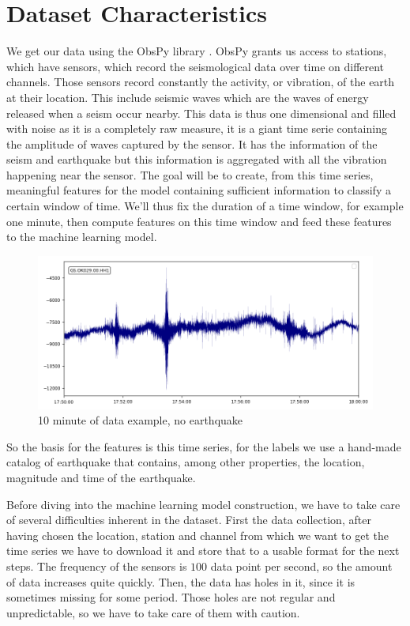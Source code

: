 \documentclass[10pt,conference,compsocconf]{IEEEtran}
\begin{document}
\section{Dataset Characteristics}
We get our data using the ObsPy library \cite{obspy}. ObsPy grants us access to stations, which have sensors, which record the seismological data over time on different channels. Those sensors record  constantly the activity, or vibration, of the earth at their location. This include seismic waves which are the waves of energy released when a seism occur nearby. This data is thus one dimensional and filled with noise as it is a completely raw measure, it is a giant time serie containing the amplitude of waves captured by the sensor. It has the information of the seism and earthquake but this information is aggregated with all the vibration happening near the sensor. The goal will be to create, from this time series, meaningful features for the model containing sufficient information to classify a certain window of time. We'll thus fix the duration of a time window, for example one minute, then compute features on this time window and feed these features to the machine learning model.

\begin{figure}[h]
  \centering
	\includegraphics[width=\columnwidth]{10min-example-2018-06-30T17:50.png}
  \caption{10 minute of data example, no earthquake}
	\label{fig:10min-example}
\end{figure}

So the basis for the features is this time series, for the labels we use a hand-made catalog of earthquake that contains, among other properties, the location, magnitude and time of the earthquake.

Before diving into the machine learning model construction, we have to take care of several difficulties inherent in the dataset.\newline
First the data collection, after having chosen the location, station and channel from which we want to get the time series we have to download it and store that to a usable format for the next steps. The frequency of the sensors is $100$ data point per second, so the amount of data increases quite quickly. Then, the data has holes in it, since it is sometimes missing for some period. Those holes are not regular and unpredictable, so we have to take care of them with caution.
\end{document}
